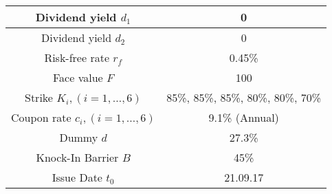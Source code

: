 \documentclass[11pt,reqno]{article}
\numberwithin{equation}{section}
\begin{document}
{\begin{table}[H]
\begin{tabular}{|c|c|}
Dividend yield $d_1$                                                                                                                                                              & 0                                                                                            \\ \hline
Dividend yield $d_2$                                                                                                                                                              & 0                                                                                            \\ \hline
Risk-free rate $r_f$                                                                                                                                                              & 0.45\%                                                                                       \\ \hline
Face value $F$                                                                                                                                                                    & 100                                                                                          \\ \hline
Strike $K_i, (i = 1, \ldots, 6)$                                                                                                                                                  & 85\%, 85\%, 85\%, 80\%, 80\%, 70\%                                                           \\ \hline
Coupon rate $c_i, (i = 1, \ldots, 6)$                                                                                                                                             & 9.1\% (Annual)                                                                               \\ \hline
Dummy $d$                                                                                                                                                                         & 27.3\%                                                                                       \\ \hline
Knock-In Barrier $B$                                                                                                                                                              & 45\%                                                                                         \\ \hline
Issue Date $t_0$                                                                                                                                                                  & 21.09.17                                                                                     \\ \hline

\end{tabular}
\end{table}}
\end{document}
